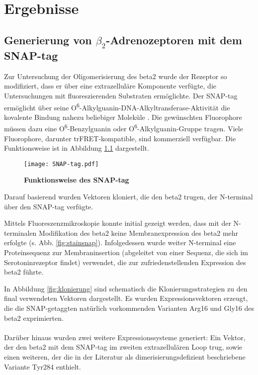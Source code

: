 \chapter{Ergebnisse} \label{chapter:ergebnisse}
\section{Generierung von $\beta_2$-Adrenozeptoren mit dem SNAP-tag} \label{klonierung}
Zur Untersuchung der Oligomerisierung des \gls{beta2} wurde der Rezeptor so modifiziert, dass er über eine extrazelluläre Komponente verfügte, die Untersuchungen mit fluoreszierenden Substraten ermöglichte. Der SNAP-tag ermöglicht über seine O\textsuperscript{6}-Alkylguanin-DNA-Alkyltransferase-Aktivität die kovalente Bindung nahezu beliebiger Moleküle \parencite{Gronemeyer2006}. Die gewünschten Fluorophore müssen dazu eine O\textsuperscript{6}-Benzylguanin oder O\textsuperscript{6}-Alkylguanin-Gruppe tragen. Viele Fluorophore, darunter trFRET-kompatible, sind kommerziell verfügbar. Die Funktionsweise ist in Abbildung \ref{fig:snap-tag} dargestellt.

\begin{figure}[htp]
    \texttt{[image: SNAP-tag.pdf]}
    \caption{\textbf{Funktionsweise des SNAP-tag}}
    \label{fig:snap-tag}
\end{figure}

Darauf basierend wurden Vektoren kloniert, die den \gls{beta2} trugen, der N-terminal über den SNAP-tag verfügte. 

Mittels Fluoreszenzmikroskopie konnte initial gezeigt werden, dass mit der N-terminalen Modifikation des \gls{beta2} keine Membranexpression des \gls{beta2} mehr erfolgte (s. Abb. \ref{fig:stainsnap}). Infolgedessen wurde weiter N-terminal eine Proteinsequenz zur Membraninsertion (abgeleitet von einer Sequenz, die sich im Serotoninrezeptor findet) verwendet, die zur zufriedenstellenden Expression des \gls{beta2} führte. 

In Abbildung \ref{fig:klonierung} sind schematisch die Klonierungsstrategien zu den final verwendeten Vektoren dargestellt. Es wurden Expressionsvektoren erzeugt, die die SNAP-getaggten natürlich vorkommenden Varianten Arg16 und Gly16 des \gls{beta2} exprimierten.
\\ \\ 
Darüber hinaus wurden zwei weitere Expressionssysteme generiert: Ein Vektor, der den \gls{beta2} mit dem SNAP-tag im zweiten extrazellulären Loop trug, sowie einen weiteren, der die in der Literatur als dimerisierungsdefizient beschriebene Variante Tyr284 \parencite{Salahpour2004} enthielt.


